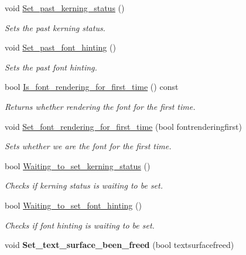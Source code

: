 \begin{DoxyCompactItemize}
void \hyperlink{classjetfuel_1_1draw_1_1Text_a98b604584ef64a98b148add202334c8b}{Set\+\_\+past\+\_\+kerning\+\_\+status} ()
\begin{DoxyCompactList}\small\item\em Sets the past kerning status. \end{DoxyCompactList}\item 
void \hyperlink{classjetfuel_1_1draw_1_1Text_af867aba4f3951b99bc23f3bf8d7cf201}{Set\+\_\+past\+\_\+font\+\_\+hinting} ()
\begin{DoxyCompactList}\small\item\em Sets the past font hinting. \end{DoxyCompactList}\item 
bool \hyperlink{classjetfuel_1_1draw_1_1Text_a007454f20452791fe80f981e45fab1d7}{Is\+\_\+font\+\_\+rendering\+\_\+for\+\_\+first\+\_\+time} () const
\begin{DoxyCompactList}\small\item\em Returns whether rendering the font for the first time. \end{DoxyCompactList}\item 
void \hyperlink{classjetfuel_1_1draw_1_1Text_ac5bcf85ef9195b5bba77441eeddf2f6c}{Set\+\_\+font\+\_\+rendering\+\_\+for\+\_\+first\+\_\+time} (bool fontrenderingfirst)
\begin{DoxyCompactList}\small\item\em Sets whether we are the font for the first time. \end{DoxyCompactList}\item 
bool \hyperlink{classjetfuel_1_1draw_1_1Text_ac3037b299f5e398da3c1bf52fdfa3d00}{Waiting\+\_\+to\+\_\+set\+\_\+kerning\+\_\+status} ()
\begin{DoxyCompactList}\small\item\em Checks if kerning status is waiting to be set. \end{DoxyCompactList}\item 
bool \hyperlink{classjetfuel_1_1draw_1_1Text_a33158c6a5dfedf26cb0526388c347e93}{Waiting\+\_\+to\+\_\+set\+\_\+font\+\_\+hinting} ()
\begin{DoxyCompactList}\small\item\em Checks if font hinting is waiting to be set. \end{DoxyCompactList}\item 
\mbox{\label{classjetfuel_1_1draw_1_1Text_acc627c1cda5f466255b1899cd9477a75}} 
void {\bfseries Set\+\_\+text\+\_\+surface\+\_\+been\+\_\+freed} (bool textsurfacefreed)

\end{DoxyCompactItemize}
